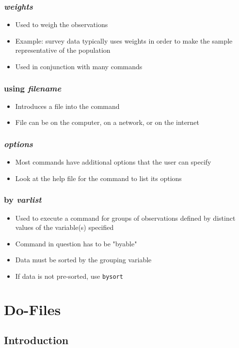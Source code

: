 \documentclass{beamer}
\begin{document}
\begin{frame}
	\frametitle{\textit{weights}}
		\begin{itemize}
			\item Used to weigh the observations
			\item Example: survey data typically uses weights in order to make the sample representative of the population
			\item Used in conjunction with many commands
		\end{itemize}
\end{frame}

\begin{frame}
	\frametitle{using \textit{filename}}
		\begin{itemize}
			\item Introduces a file into the command
			\item File can be on the computer, on a network, or on the internet
		\end{itemize}
\end{frame}

\begin{frame}
	\frametitle{\textit{options}}
		\begin{itemize}
			\item Most commands have additional options that the user can specify
			\item Look at the help file for the command to list its options
		\end{itemize}
\end{frame}

\begin{frame}
	\frametitle{by \textit{varlist}}
		\begin{itemize}
			\item Used to execute a command for groups of observations defined by distinct values of the variable(s) specified
			\item Command in question has to be "byable"
			\item Data must be sorted by the grouping variable
			\item If data is not pre-sorted, use \texttt{bysort}
		\end{itemize}
\end{frame}

\section{Do-Files}

\subsection{Introduction}
\end{document}

